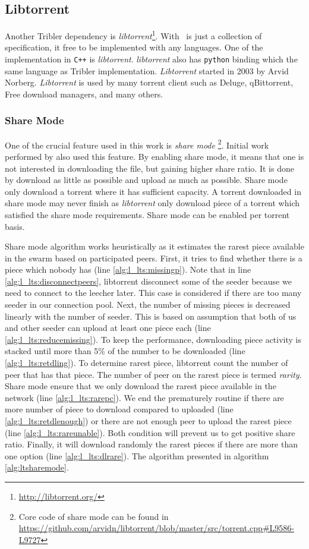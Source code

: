 \subsection{Libtorrent}
Another Tribler dependency is \textit{libtorrent}\footnote{\url{http://libtorrent.org/}}. With \bt~is just a collection of specification, it free to be implemented with any languages. One of the implementation in \texttt{C++} is \textit{libtorrent}. \textit{libtorrent} also has \texttt{python} binding which the same language as Tribler implementation. \textit{Libtorrent} started in 2003 by Arvid Norberg. \textit{Libtorrent} is used by many torrent client such as Deluge, qBittorrent, Free download managers, and many others.

\subsubsection{Share Mode}
One of the crucial feature used in this work is \textit{share mode} \footnote{Core code of share mode can be found in \url{https://github.com/arvidn/libtorrent/blob/master/src/torrent.cpp\#L9586-L9727}}. Initial work performed by \citeauthor{2015:creditmining:capota} also used this feature\cite{2015:creditmining:capota}. By enabling share mode, it means that one is not interested in downloading the file, but gaining higher share ratio. It is done by download as little as possible and upload as much as possible. Share mode only download a torrent where it has sufficient capacity. A torrent downloaded in share mode may never finish as \textit{libtorrent} only download piece of a torrent which satisfied the share mode requirements. Share mode can be enabled per torrent basis.

Share mode algorithm works heuristically as it estimates the rarest piece available in the swarm based on participated peers. First, it tries to find whether there is a piece which nobody has (line \ref{alg:l_lts:missingp}). Note that in line \ref{alg:l_lts:disconnectpeers}, libtorrent disconnect some of the seeder because we need to connect to the leecher later. This case is considered if there are too many seeder in our connection pool. Next, the number of missing pieces is decreased linearly with the number of seeder. This is based on assumption that both of us and other seeder can upload at least one piece each (line \ref{alg:l_lts:reducemissing}). To keep the performance, downloading piece activity is stacked until more than 5\% of the number to be downloaded (line \ref{alg:l_lts:retdling}). To determine rarest piece, libtorrent count the number of peer that has that piece. The number of peer on the rarest piece is termed \textit{rarity}. Share mode ensure that we only download the rarest piece available in the network (line \ref{alg:l_lts:rarepc}). We end the prematurely routine if there are more number of piece to download compared to uploaded (line \ref{alg:l_lts:retdlenough}) or there are not enough peer to upload the rarest piece (line \ref{alg:l_lts:rareunable}). Both condition will prevent us to get positive share ratio. Finally, it will download randomly the rarest pieces if there are more than one option (line \ref{alg:l_lts:dlrare}). The algorithm presented in algorithm \ref{alg:ltsharemode}. 

